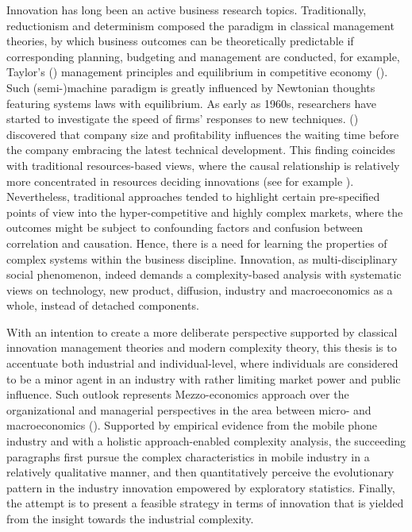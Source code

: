 \documentclass[utf8,english]{gradu3}
\begin{document}
 Innovation has long been an active business research topics. Traditionally, reductionism and determinism composed the paradigm in classical management theories, by which business outcomes can be theoretically predictable if corresponding planning, budgeting and management are conducted, for example, Taylor's (\citeyear{taylor1911shop}) management principles and equilibrium in competitive economy (\cite{arrow1954existence}). Such (semi-)machine paradigm is greatly influenced by Newtonian thoughts featuring systems laws with equilibrium. As early as 1960s, researchers have started to investigate the speed of firms' responses to new techniques. \citeauthor{mansfield1963speed} (\citeyear{mansfield1963speed}) discovered that company size and profitability influences the waiting time before the company embracing the latest technical development. This finding coincides with traditional resources-based views, where the causal relationship is relatively more concentrated in resources deciding innovations (see for example \cite{wernerfelt1984resource}). Nevertheless, traditional approaches tended to highlight certain pre-specified points of view into the hyper-competitive and highly complex markets, where the outcomes might be subject to confounding factors and confusion between correlation and causation. Hence, there is a need for learning the properties of complex systems within the business discipline. Innovation, as multi-disciplinary social phenomenon, indeed demands a complexity-based analysis with systematic views on technology, new product, diffusion, industry and macroeconomics as a whole, instead of detached components.

With an intention to create a more deliberate perspective supported by classical innovation management theories and modern complexity theory, this thesis is to accentuate both industrial and individual-level, where individuals are considered to be a minor agent in an industry with rather limiting market power and public influence. Such outlook represents Mezzo-economics approach over the organizational and managerial perspectives in the area between micro- and macroeconomics (\cite{kozuharov2011mezzo}). Supported by empirical evidence from the mobile phone industry and with a holistic approach-enabled complexity analysis, the succeeding paragraphs first pursue the complex characteristics in mobile industry in a relatively qualitative manner, and then quantitatively perceive the evolutionary pattern in the industry innovation empowered by exploratory statistics. Finally, the attempt is to present a feasible strategy in terms of innovation that is yielded from the insight towards the industrial complexity. 
\end{document}
